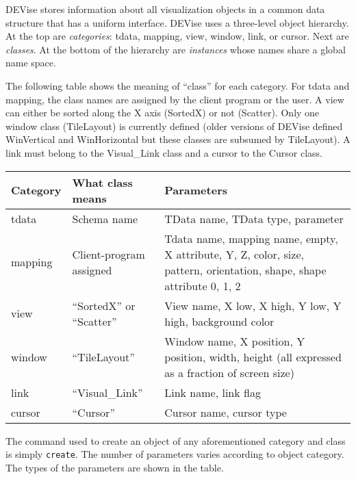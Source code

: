 DEVise stores information about all visualization objects in a common
data structure that has a uniform interface. DEVise uses a three-level
object hierarchy. At the top are {\em categories}: tdata, mapping,
view, window, link, or cursor. Next are {\em classes}. At the bottom
of the hierarchy are {\em instances} whose names share a global name
space.

The following table shows the meaning of ``class'' for each category.
For tdata and mapping, the class names are assigned by the client
program or the user. A view can either be sorted along the X axis
(SortedX) or not (Scatter). Only one window class (TileLayout) is
currently defined (older versions of DEVise defined WinVertical and
WinHorizontal but these classes are subsumed by TileLayout). A link
must belong to the Visual\_Link class and a cursor to the Cursor
class.

\bigskip

\noindent
\begin{tabular}{l|l|p{4in}}
Category & What class means           & Parameters\\
\hline
tdata    & Schema name                & TData name, TData type, parameter \\
mapping  & Client-program assigned    & Tdata name, mapping name, empty,
                                        X attribute, Y, Z, color, size,
                                        pattern, orientation, shape,
                                        shape attribute 0, 1, 2 \\
view     & ``SortedX'' or ``Scatter'' & View name, X low, X high, Y low,
                                        Y high, background color \\
window   & ``TileLayout''             & Window name, X position, Y position,
                                        width, height (all expressed as a
                                        fraction of screen size) \\
link     & ``Visual\_Link''           & Link name, link flag \\
cursor   & ``Cursor''                 & Cursor name, cursor type \\
\hline
\end{tabular}

\bigskip

The command used to create an object of any aforementioned category
and class is simply {\tt create}. The number of parameters varies
according to object category. The types of the parameters are shown in
the table.

